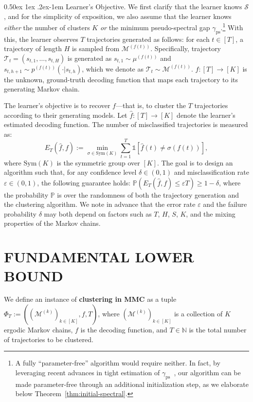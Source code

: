 \documentclass[twoside]{article}
\makeatletter
\renewcommand{\paragraph}{%
  \@startsection{paragraph}{4}%
  {\z@}{0.50ex \@plus 1ex \@minus .2ex}{-1em}%
  {\normalfont\normalsize\bfseries}%
}
\def\gM{{\mathcal{M}}}
\def\gS{{\mathcal{S}}}
\def\gT{{\mathcal{T}}}
\def\sP{{\mathbb{P}}}
\theoremstyle{plain}
\newcommand{\ps}{\mathrm{ps}}
\newcommand{\Sym}{\mathrm{Sym}}
\makeatother
\begin{document}
\paragraph{Learner's Objective.}
We first clarify that the learner knows $\gS$, and for the simplicity of exposition, we also assume that the learner knows \textit{either} the number of clusters $K$ \textit{or} the minimum pseudo-spectral gap $\gamma_\ps$.\footnote{A fully “parameter-free” algorithm would require neither. In fact, by leveraging recent advances in tight estimation of $\gamma_\ps$~\citep{wolfer2024mixing}, our algorithm can be made parameter-free through an additional initialization step, as we elaborate below Theorem~\ref{thm:initial-spectral}.}
With this, the learner observes $T$ trajectories generated as follows: for each $t \in [T]$, a trajectory of length $H$ is sampled from $\gM^{(f(t))}$.
Specifically, trajectory $\gT_t = (s_{t,1}, \dots, s_{t,H})$ is generated as $s_{t,1} \sim \mu^{(f(t))}$ and $s_{t,h+1} \sim p^{(f(t))}(\cdot | s_{t,h})$, which we denote as $\gT_t \sim \gM^{(f(t))}$.
$f: [T] \rightarrow [K]$ is the unknown, ground-truth decoding function that maps each trajectory to its generating Markov chain.

The learner’s objective is to recover $f$—that is, to cluster the $T$ trajectories according to their generating models. Let $\widehat{f} : [T] \rightarrow [K]$ denote the learner's estimated decoding function. The number of misclassified trajectories is measured as:
$$
E_T(\widehat{f}, f) := \min_{\sigma \in \Sym(K)} \sum_{t=1}^T \mathds{1}[\widehat{f}(t) \neq \sigma(f(t))],
$$
where $\Sym(K)$ is the symmetric group over $[K]$. The goal is to design an algorithm such that, for any confidence level $\delta \in (0, 1)$ and misclassification rate $\varepsilon \in (0, 1)$, the following guarantee holds: $\sP ( E_T(\widehat{f}, f) \leq \varepsilon T ) \geq 1 - \delta$, where the probability $\mathbb{P}$ is over the randomness of both the trajectory generation and the clustering algorithm.
We note in advance that the error rate $\varepsilon$ and the failure probability $\delta$ may both depend on factors such as $T$, $H$, $S$, $K$, and the mixing properties of the Markov chains.


\section{FUNDAMENTAL LOWER BOUND}
\label{sec:lowerbound}
We define an instance of \textbf{clustering in MMC} as a tuple $\Phi_T := ((\gM^{(k)})_{k \in [K]}, f, T)$, where $(\gM^{(k)})_{k \in [K]}$ is a collection of $K$ ergodic Markov chains, $f$ is the decoding function, and $T \in \mathbb{N}$ is the total number of trajectories to be clustered.
\end{document}
